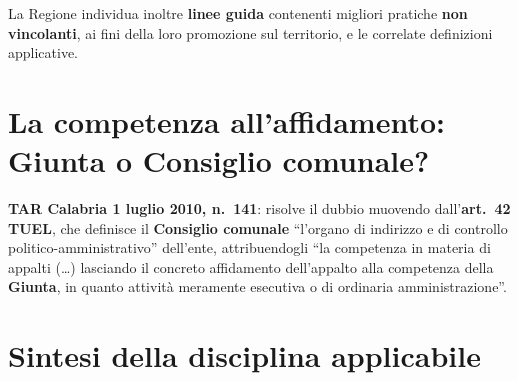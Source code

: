 La Regione individua inoltre \textbf{linee guida} contenenti migliori pratiche \textbf{non
vincolanti}, ai fini della loro promozione sul territorio, e le correlate definizioni applicative.


\section{La competenza all'affidamento: Giunta o Consiglio comunale?}

\textbf{TAR Calabria 1 luglio 2010, n.\ 141}: risolve il dubbio muovendo dall'\textbf{art.\ 42
TUEL}, che definisce il \textbf{Consiglio comunale} ``l'organo di indirizzo e di controllo
politico-amministrativo'' dell'ente, attribuendogli ``la competenza in materia di appalti
(\dots) lasciando il concreto affidamento dell'appalto alla competenza della \textbf{Giunta}, in
quanto attività meramente esecutiva o di ordinaria amministrazione''.


\section{Sintesi della disciplina applicabile}


